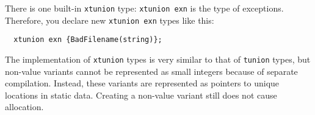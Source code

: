 There is one built-in \texttt{xtunion} type: \texttt{xtunion exn} is the
type of exceptions.  Therefore, you declare new \texttt{xtunion exn}
types like this:

\begin{verbatim}
  xtunion exn {BadFilename(string)};
\end{verbatim}

The implementation of \texttt{xtunion} types is very similar to that of
\texttt{tunion} types, but non-value variants cannot be represented as
small integers because of separate compilation.  Instead, these
variants are represented as pointers to unique locations in static
data.  Creating a non-value variant still does not cause allocation.

